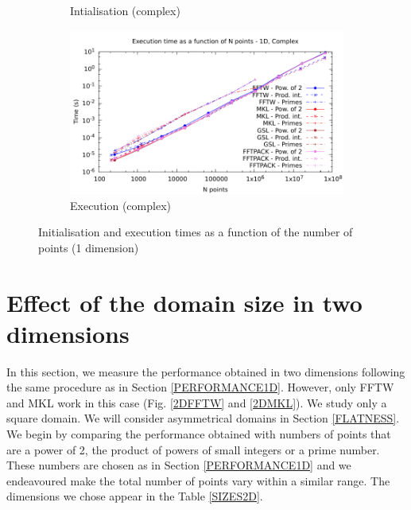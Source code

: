 \documentclass[12pt, a4paper]{article}
\begin{document}
\begin{figure}[H]
\begin{subfigure}{.5\textwidth}
\caption{Intialisation (complex)}
\label{1DCI}
\end{subfigure}%
\begin{subfigure}{.5\textwidth}
\centering
\includegraphics[width=.9\linewidth]{graphs/1d-exec-c.pdf}
\caption{Execution (complex)}
\label{1DC}
\end{subfigure}
\caption{Initialisation and execution times as a function of the number of points (1 dimension)}
\label{1D}
\end{figure}

\section{Effect of the domain size in two dimensions}\label{PERFORMANCE2D}

In this section, we measure the performance obtained in two dimensions following the same procedure as in Section \ref{PERFORMANCE1D}. However, only FFTW and MKL work in this case (Fig. \ref{2DFFTW} and \ref{2DMKL}). We study only a square domain. We will consider asymmetrical domains in Section \ref{FLATNESS}. \\

We begin by comparing the performance obtained with numbers of points that are a power of 2, the product of powers of small integers or a prime number. These numbers are chosen as in Section \ref{PERFORMANCE1D} and we endeavoured make the total number of points vary within a similar range. The dimensions we chose appear in the Table \ref{SIZES2D}.\\
\end{document}
